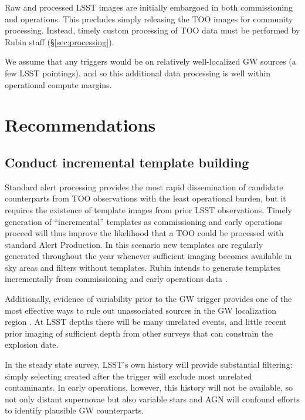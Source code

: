 \documentclass[DM,authoryear,toc]{lsstdoc}
\begin{document}
Raw and processed LSST images are initially embargoed in both commissioning and operations.
This precludes simply releasing the TOO images for community processing.
Instead, timely custom processing of TOO data must be performed by Rubin staff (\S \ref{sec:processing}).

We assume that any triggers would be on relatively well-localized GW sources (a few LSST pointings), and so this additional data processing is well within operational compute margins.

\section{Recommendations}

\subsection{Conduct incremental template building} \label{sec:templates}

Standard alert processing provides the most rapid dissemination of candidate counterparts from TOO observations with the least operational burden, but it requires the existence of template images from prior LSST observations.
Timely generation of ``incremental'' templates as commissioning and early operations proceed will thus improve the likelihood that a TOO could be processed with standard Alert Production.
In this scenario new templates are regularly generated throughout the year whenever sufficient imaging becomes available in sky areas and filters without templates.
Rubin intends to generate templates incrementally from commissioning and early operations data .

Additionally, evidence of variability prior to the GW trigger provides one of the most effective ways to rule out unassociated sources in the GW localization region \citep[e.g.,][]{2019GCN.24223....1C, 2019GCN.26430....1S}.
At LSST depths there will be many unrelated events, and little recent prior imaging of sufficient depth from other surveys that can constrain the explosion date.

In the steady state survey, LSST's own history will provide substantial filtering: simply selecting \DIAObjects created after the trigger will exclude most unrelated contaminants.
In early operations, however, this history will not be available, so not only distant supernovae but also variable stars and AGN will confound efforts to identify plausible GW counterparts.
\end{document}
